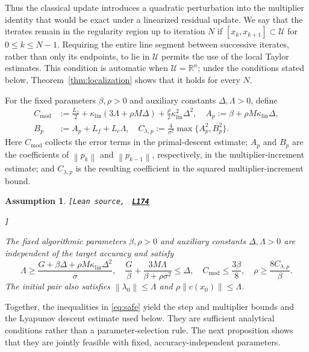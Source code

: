 \documentclass[11pt]{article}
\newtheorem{assumption}[theorem]{Assumption}
\theoremstyle{definition}
\theoremstyle{remark}
\numberwithin{equation}{section}
\numberwithin{figure}{section}
\numberwithin{table}{section}
\numberwithin{algorithm}{section}
\newcommand{\R}{\mathbb{R}}
\newcommand{\norm}[1]{\left\lVert #1\right\rVert}
\newcommand{\leanLinkText}[1]{%
  \underline{\textbf{#1}}%
}
\newcommand{\leanDeclTag}[2]{%
  {\footnotesize\texttt{[Lean source, }}%
  \href{https://github.com/optpku/ReasBook/blob/v4.32.2/ReasBook/Papers/TR_LALM_theory/#1?plain=1\#L#2}%
    {\leanLinkText{\footnotesize\texttt{L#2}}}%
}
\newcommand{\leanDeclTagEnd}{%
  \unskip
  {\footnotesize\texttt{]}}\enspace
}
\begin{document}
Thus the classical update introduces a quadratic perturbation into the multiplier identity that would be exact under a linearized residual update. We say that the iterates remain in the regularity region up to iteration $N$ if $[x_k,x_{k+1}]\subset\mathcal U$ for $0\le k\le N-1$. Requiring the entire line segment between successive iterates, rather than only its endpoints, to lie in $\mathcal U$ permits the use of the local Taylor estimates. This condition is automatic when $\mathcal U=\R^n$; under the conditions stated below, Theorem~\ref{thm:localization} shows that it holds for every $N$.

For the fixed parameters $\beta,\rho>0$ and auxiliary constants
$\Delta,\Lambda>0$, define
$$
\begin{aligned}
    C_{\mathrm{mod}}
    &:=\frac{L_f}{2}
      +\kappa_{\mathrm{lin}}(3\Lambda+\rho M\Delta)
      +\frac{\rho}{2}\kappa_{\mathrm{lin}}^2\Delta^2,\quad
    A_p:=\beta+\rho M\kappa_{\mathrm{lin}}\Delta,\\
    B_p&:=A_p+L_f+L_c\Lambda,\quad
    C_{\lambda,p}:=\frac{4}{\sigma^2}\max\{A_p^2,B_p^2\}.
\end{aligned}
$$
Here $C_{\mathrm{mod}}$ collects the error terms in the primal-descent estimate; $A_p$ and $B_p$ are the coefficients of $\norm{p_k}$ and $\norm{p_{k-1}}$, respectively, in the multiplier-increment estimate; and $C_{\lambda,p}$ is the resulting coefficient in the squared multiplier-increment bound.

\begin{assumption}
\label{ass:safe}
\leanDeclTag{Assumption_2_3.lean}{174}
\leanDeclTagEnd
The fixed algorithmic parameters $\beta,\rho>0$ and auxiliary constants $\Delta,\Lambda>0$ are independent of the target accuracy and satisfy
\begin{equation}
\Lambda
\ge\frac{G+\beta\Delta
+\rho M\kappa_{\mathrm{lin}}\Delta^2}{\sigma},
\quad
\frac{G}{\beta}+\frac{3M\Lambda}{\beta+\rho\sigma^2}
\le\Delta,
\quad
C_{\mathrm{mod}}
\le\frac{3\beta}{8},
\quad
\rho
\ge\frac{8C_{\lambda,p}}{\beta}.
\label{eq:safe}
\end{equation}
The initial pair also satisfies $\norm{\lambda_0}\le\Lambda$ and
$\rho\norm{c(x_0)}\le\Lambda$.
\end{assumption}

Together, the inequalities in \eqref{eq:safe} yield the step and multiplier bounds and the Lyapunov descent estimate used below.  They are sufficient analytical conditions rather than a parameter-selection rule.  The next proposition shows that they are jointly feasible with fixed, accuracy-independent parameters.
\end{document}
